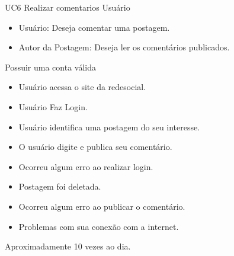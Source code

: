\casoDeUso
{UC6}
{Realizar comentarios}
{Usuário}
{
\begin{itemize}
	\item Usuário: Deseja comentar uma postagem.
	\item Autor da Postagem: Deseja ler os comentários publicados.
\end{itemize}

}
{Possuir uma conta válida}
{}
{
\begin{itemize}
\item Usuário acessa o site da redesocial.
\item Usuário Faz Login.
\item Usuário identifica uma postagem do seu interesse.
\item O usuário digite e publica seu comentário.
\end{itemize}
}
{
\begin{itemize}
\item Ocorreu algum erro ao realizar login.
\item Postagem foi deletada.
\item Ocorreu algum erro ao publicar o comentário.
\item Problemas com sua conexão com a internet.
\end{itemize}
}
{Aproximadamente 10 vezes ao dia.}
{

}




